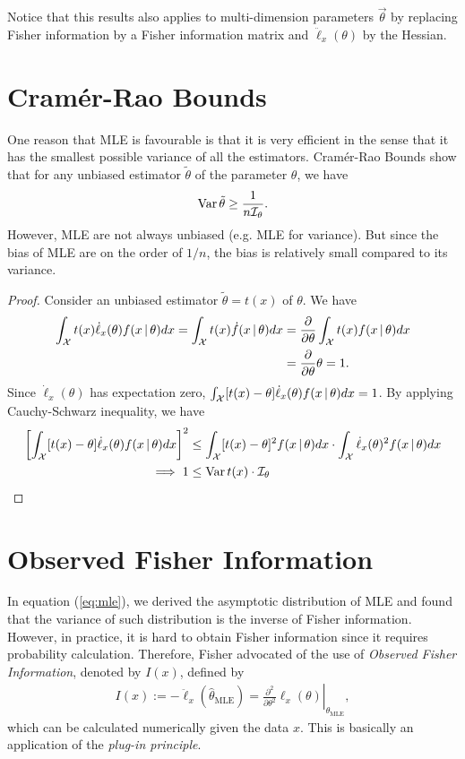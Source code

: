 \documentclass[11pt]{article}
\begin{document}
Notice that this results also applies to multi-dimension parameters $\vec{\theta}$
by replacing Fisher information by a Fisher information matrix and $\ddot\ell_{x}(\theta)$ by
the Hessian.

\section{Cram\'er-Rao Bounds}

One reason that MLE is favourable is that it is very efficient in the sense
that it has the smallest possible variance of all the estimators.
Cram\'er-Rao Bounds show that for any unbiased estimator $\tilde{\theta}$
of the parameter $\theta$, we have
\begin{align*}
	\operatorname{Var}{\tilde{\theta}}\geq\frac1{n\mathcal{I}_{\theta}}.
\end{align*}
However, MLE are not always unbiased (e.g.\! MLE for variance).
But since the bias of MLE are on the order of $1/n$,
the bias is relatively small compared to its variance.

\begin{proof}
	Consider an unbiased estimator $\tilde{\theta}=t(x)$ of $\theta$.
	We have
	\begin{align*}
		\int_{\mathcal{X}} t(x)\dot\ell_{x}(\theta)f(x\,|\,\theta) d{x}
		= \int_{\mathcal{X}} t(x)\dot f(x\,|\,\theta) d{x}
		&= \frac{\partial}{\partial\theta} \int_{\mathcal{X}} t(x)f(x\,|\,\theta) d{x} \\
		&= \frac{\partial}{\partial\theta} \theta
		= 1.
	\end{align*}
	Since $\dot\ell_{x}(\theta)$ has expectation zero,
	$\int_{\mathcal{X}}[t(x)-\theta]\dot\ell_{x}(\theta)f(x\,|\,\theta)d{x}=1$.
	By applying Cauchy-Schwarz inequality, we have
	\begin{align*}
		\left[\int_{\mathcal{X}}[t(x)-\theta]\dot\ell_{x}(\theta)f(x\,|\,\theta)d{x}\right]^2
		&\leq \int_{\mathcal{X}} [t(x)-\theta]^2 f(x\,|\,\theta) d{x} \cdot
		\int_{\mathcal{X}} \dot\ell_{x}(\theta)^2 f(x\,|\,\theta) d{x} \\
		\implies 1 &\leq \operatorname{Var}{t(x)} \cdot \mathcal{I}_{\theta}
	\end{align*}
\end{proof}

\section{Observed Fisher Information}

In equation (\ref{eq:mle}),
we derived the asymptotic distribution of MLE and found that
the variance of such distribution is the inverse of Fisher information.
However, in practice, it is hard to obtain Fisher information since it 
requires probability calculation.
Therefore, Fisher advocated of the use of \emph{Observed Fisher Information},
denoted by $I(x)$, defined by
\begin{align*}
	I(x)
	:= -\ddot\ell_{x}(\hat{\theta}_{\text{MLE}})
	= \left. \frac{\partial^2}{\partial\theta^2} \ell_{x}(\theta) \right|_{\hat{\theta}_{\text{MLE}}},
\end{align*}
which can be calculated numerically given the data $x$.
This is basically an application of the \emph{plug-in principle}.
\end{document}
